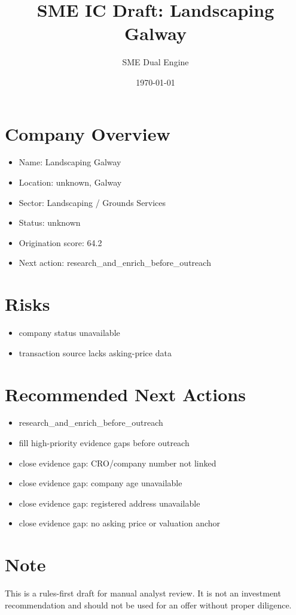 \documentclass[11pt,a4paper]{article}
\title{SME IC Draft: Landscaping Galway}
\author{SME Dual Engine}
\date{\today}
\begin{document}
\maketitle
\section*{Company Overview}
\begin{itemize}[leftmargin=1.4em]
\item Name: Landscaping Galway
\item Location: unknown, Galway
\item Sector: Landscaping / Grounds Services
\item Status: unknown
\item Origination score: 64.2
\item Next action: research\_and\_enrich\_before\_outreach
\end{itemize}
\section*{Risks}
\begin{itemize}[leftmargin=1.4em]
\item company status unavailable
\item transaction source lacks asking-price data
\end{itemize}
\section*{Recommended Next Actions}
\begin{itemize}[leftmargin=1.4em]
\item research\_and\_enrich\_before\_outreach
\item fill high-priority evidence gaps before outreach
\item close evidence gap: CRO/company number not linked
\item close evidence gap: company age unavailable
\item close evidence gap: registered address unavailable
\item close evidence gap: no asking price or valuation anchor
\end{itemize}
\section*{Note}
This is a rules-first draft for manual analyst review. It is not an investment
recommendation and should not be used for an offer without proper diligence.
\end{document}

